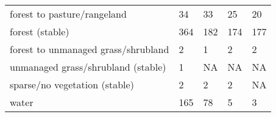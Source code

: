 \begin{table}[]
{\begin{tabular}{lllll}
forest to pasture/rangeland                    & 34          & 33               & 25        & 20              \\
forest (stable)                                & 364         & 182              & 174       & 177             \\
forest to unmanaged grass/shrubland            & 2           & 1                & 2         & 2               \\
unmanaged grass/shrubland (stable)             & 1           & NA               & NA        & NA              \\
sparse/no vegetation (stable)                  & 2           & 2                & 2         & NA              \\
water                                          & 165         & 78               & 5         & 3              
\end{tabular}%
}
\end{table}

